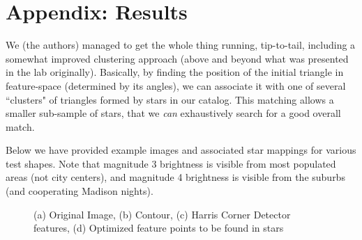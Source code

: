 \documentclass[paper=a4, fontsize=11pt]{scrartcl} %
\begin{document}



\section*{Appendix: Results}

We (the authors) managed to get the whole thing running, tip-to-tail, including a somewhat improved clustering approach (above and beyond what was presented in the lab originally). Basically, by finding the position of the initial triangle in feature-space (determined by its angles), we can associate it with one of several ``clusters" of triangles formed by stars in our catalog. This matching allows a smaller sub-sample of stars, that we \textit{can} exhaustively search for a good overall match.

Below we have provided example images and associated star mappings for various test shapes. Note that magnitude 3 brightness is visible from most populated areas (not city centers), and magnitude 4 brightness is visible from the suburbs (and cooperating Madison nights). 

\begin{figure}[!h]
\caption{(a) Original Image, (b) Contour, (c) Harris Corner Detector features, (d) Optimized feature points to be found in stars}
\label{duck}
\end{figure}
\end{document}
